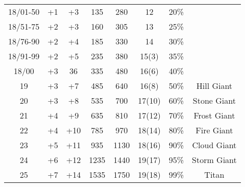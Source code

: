 \documentclass[../main.tex]{subfiles}
\begin{document}
\begin{multicols}{3}
\begin{table}[]
{\begin{tabular}{cccccccc}
	18/01-50 & +1 & +3 & 135 & 280 & 12 & 20\% &  \\
	18/51-75 & +2 & +3 & 160 & 305 & 13 & 25\% &  \\
	18/76-90 & +2 & +4 & 185 & 330 & 14 & 30\% &  \\
	18/91-99 & +2 & +5 & 235 & 380 & 15(3) & 35\% &  \\
	18/00 & +3 & 36 & 335 & 480 & 16(6) & 40\% &  \\
	19 & +3 & +7 & 485 & 640 & 16(8) & 50\% & Hill Giant \\
	20 & +3 & +8 & 535 & 700 & 17(10) & 60\% & Stone Giant \\
	21 & +4 & +9 & 635 & 810 & 17(12) & 70\% & Frost Giant \\
	22 & +4 & +10 & 785 & 970 & 18(14) & 80\% & Fire Giant \\
	23 & +5 & +11 & 935 & 1130 & 18(16) & 90\% & Cloud Giant \\
	24 & +6 & +12 & 1235 & 1440 & 19(17) & 95\% & Storm Giant \\
	25 & +7 & +14 & 1535 & 1750 & 19(18) & 99\% & Titan
	\end{tabular}%
	}
\end{table}


\end{multicols}
\end{document}
